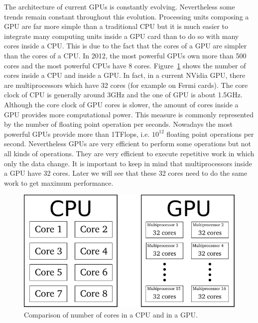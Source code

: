 The architecture   of  current GPUs  is constantly
evolving.  Nevertheless  some trends remain constant  throughout this evolution.
Processing units composing a GPU are  far more simple than a traditional CPU but
it is much easier to integrate many computing units inside a GPU card than to do
so with many cores inside a CPU. This is due to the fact that the cores of a GPU are
simpler than the cores of a CPU.  In  2012, the most powerful GPUs own more than 500
cores       and       the       most       powerful      CPUs       have       8
cores. Figure~\ref{ch1:fig:comparison_cpu_gpu} shows  the number of cores inside
a  CPU  and  inside a  GPU.   In  fact,  in  a  current NVidia  GPU,  there  are
multiprocessors which have 32 cores (for example on Fermi cards). The core clock
of CPU is  generally around 3GHz and  the one of GPU is  about 1.5GHz.  Although
the core clock of GPU cores is slower, the amount of cores inside a GPU provides
more computational power.  This measure is commonly represented by the number of
floating point operation  per seconds. Nowadays the most powerful  GPUs provide more
than   1TFlops,  i.e.    $10^{12}$   floating  point   operations  per   second.
Nevertheless  GPUs are very  efficient to  perform some  operations but  not all
kinds of operations. They are very efficient to execute repetitive work in which
only  the data  change. It  is important  to keep  in mind  that multiprocessors
inside a GPU have 32 cores. Later we will see that these 32 cores need to do the
same work to get maximum performance.

\begin{figure}[b!]
\centerline{\includegraphics[]{Chapters/chapter1/figures/nb_cores_CPU_GPU.pdf}}
\caption{Comparison of number of cores in a CPU and in a GPU.}
\label{ch1:fig:comparison_cpu_gpu}
\end{figure}

